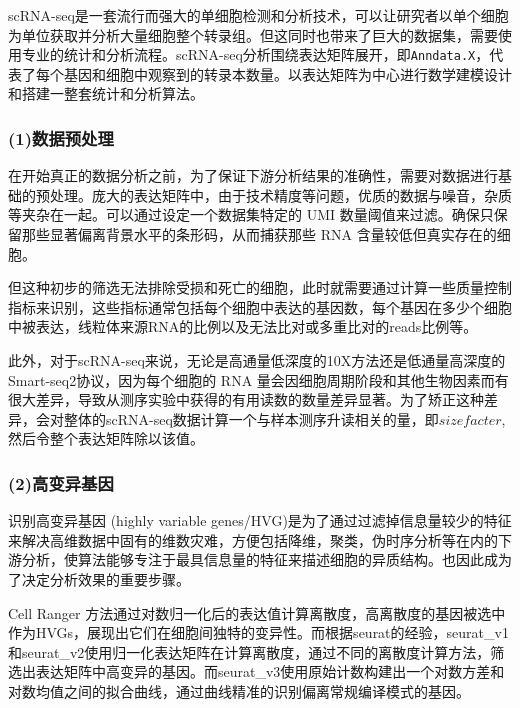 scRNA-seq是一套流行而强大的单细胞检测和分析技术，可以让研究者以单个细胞为单位获取并分析大量细胞整个转录组。但这同时也带来了巨大的数据集，需要使用专业的统计和分析流程。scRNA-seq分析围绕表达矩阵展开，即\lstinline|Anndata.X|，代表了每个基因和细胞中观察到的转录本数量。以表达矩阵为中心进行数学建模设计和搭建一整套统计和分析算法。

\subsubsection{(1)数据预处理}

在开始真正的数据分析之前，为了保证下游分析结果的准确性，需要对数据进行基础的预处理。庞大的表达矩阵中，由于技术精度等问题，优质的数据与噪音，杂质等夹杂在一起。可以通过设定一个数据集特定的 UMI 数量阈值来过滤。确保只保留那些显著偏离背景水平的条形码，从而捕获那些 RNA 含量较低但真实存在的细胞。

但这种初步的筛选无法排除受损和死亡的细胞，此时就需要通过计算一些质量控制指标来识别，这些指标通常包括每个细胞中表达的基因数，每个基因在多少个细胞中被表达，线粒体来源RNA的比例以及无法比对或多重比对的reads比例等。

此外，对于scRNA-seq来说，无论是高通量低深度的10X方法还是低通量高深度的Smart-seq2协议，因为每个细胞的 RNA 量会因细胞周期阶段和其他生物因素而有很大差异，导致从测序实验中获得的有用读数的数量差异显著。为了矫正这种差异，会对整体的scRNA-seq数据计算一个与样本测序升读相关的量，即$size facter$, 然后令整个表达矩阵除以该值。

\subsubsection{(2)高变异基因}

识别高变异基因 (highly variable genes/HVG)是为了通过过滤掉信息量较少的特征来解决高维数据中固有的维数灾难，方便包括降维，聚类，伪时序分析等在内的下游分析，使算法能够专注于最具信息量的特征来描述细胞的异质结构。也因此成为了决定分析效果的重要步骤。


Cell Ranger 方法通过对数归一化后的表达值计算离散度，高离散度的基因被选中作为HVGs，展现出它们在细胞间独特的变异性。而根据seurat的经验，seurat\_v1和seurat\_v2使用归一化表达矩阵在计算离散度，通过不同的离散度计算方法，筛选出表达矩阵中高变异的基因。而seurat\_v3使用原始计数构建出一个对数方差和对数均值之间的拟合曲线，通过曲线精准的识别偏离常规编译模式的基因。


